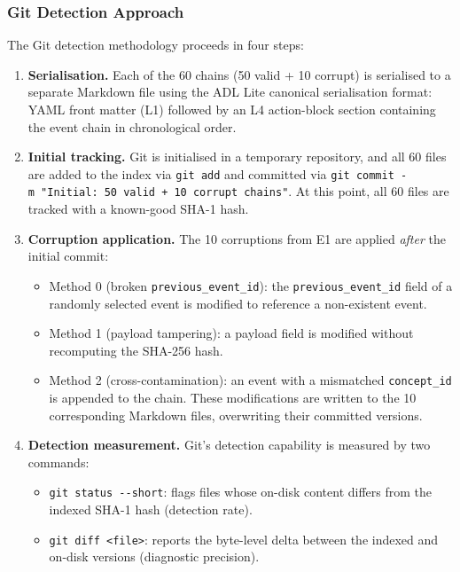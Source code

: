 \subsubsection{Git Detection Approach}\label{git-detection-approach}

The Git detection methodology proceeds in four steps:

\begin{enumerate}
\def\labelenumi{\arabic{enumi}.}
\item
  \textbf{Serialisation.} Each of the 60 chains (50 valid + 10 corrupt) is serialised to a separate Markdown file using the ADL Lite canonical serialisation format: YAML front matter (L1) followed by an L4 action-block section containing the event chain in chronological order.
\item
  \textbf{Initial tracking.} Git is initialised in a temporary repository, and all 60 files are added to the index via \texttt{git\ add} and committed via \texttt{git\ commit\ -m\ "Initial:\ 50\ valid\ +\ 10\ corrupt\ chains"}. At this point, all 60 files are tracked with a known-good SHA-1 hash.
\item
  \textbf{Corruption application.} The 10 corruptions from E1 are applied \emph{after} the initial commit:

  \begin{itemize}
  \tightlist
  \item
    Method 0 (broken \texttt{previous\_event\_id}): the \texttt{previous\_event\_id} field of a randomly selected event is modified to reference a non-existent event.
  \item
    Method 1 (payload tampering): a payload field is modified without recomputing the SHA-256 hash.
  \item
    Method 2 (cross-contamination): an event with a mismatched \texttt{concept\_id} is appended to the chain. These modifications are written to the 10 corresponding Markdown files, overwriting their committed versions.
  \end{itemize}
\item
  \textbf{Detection measurement.} Git's detection capability is measured by two commands:

  \begin{itemize}
  \tightlist
  \item
    \texttt{git\ status\ -\/-short}: flags files whose on-disk content differs from the indexed SHA-1 hash (detection rate).
  \item
    \texttt{git\ diff\ \textless{}file\textgreater{}}: reports the byte-level delta between the indexed and on-disk versions (diagnostic precision).
  \end{itemize}
\end{enumerate}

